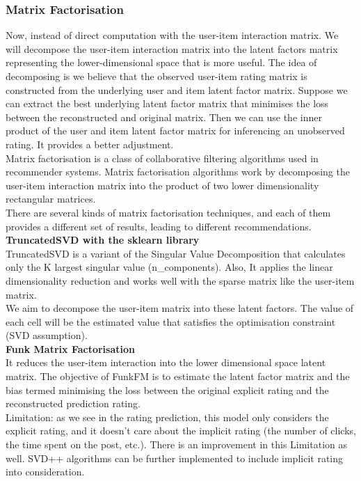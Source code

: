 \subsubsection{Matrix Factorisation}
\label{Matrix Factorisation}
\label{MatrixFac}
Now, instead of direct computation with the user-item interaction matrix. We will decompose the user-item interaction matrix into the latent factors matrix representing the lower-dimensional space that is more useful. The idea of decomposing is we believe that the observed user-item rating matrix is constructed from the underlying user and item latent factor matrix. Suppose we can extract the best underlying latent factor matrix that minimises the loss between the reconstructed and original matrix. 
Then we can use the inner product of the user and item latent factor matrix for inferencing an unobserved rating. It provides a better adjustment.
\\Matrix factorisation is a class of collaborative filtering algorithms used in recommender systems. Matrix factorisation algorithms work by decomposing the user-item interaction matrix into the product of two lower dimensionality rectangular matrices.
\\There are several kinds of matrix factorisation techniques, and each of them provides a different set of results, leading to different recommendations.
\\ \textbf{TruncatedSVD with the sklearn library}
\\TruncatedSVD is a variant of the Singular Value Decomposition that calculates only the K largest singular value (n\_components). Also, It applies the linear dimensionality reduction and works well with the sparse matrix like the user-item matrix.
\\We aim to decompose the user-item matrix into these latent factors. The value of each cell will be the estimated value that satisfies the optimisation constraint (SVD assumption).
\\ \textbf{Funk Matrix Factorisation}
\\It reduces the user-item interaction into the lower dimensional space latent matrix. The objective of FunkFM is to estimate the latent factor matrix and the bias termed minimising the loss between the original explicit rating and the reconstructed prediction rating.
\\ Limitation: as we see in the rating prediction, this model only considers the explicit rating, and it doesn't care about the implicit rating (the number of clicks, the time spent on the post, etc.). There is an improvement in this Limitation as well. SVD++ algorithms can be further implemented to include implicit rating into consideration.
